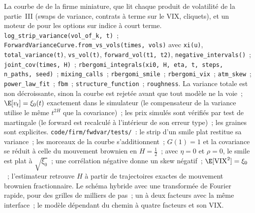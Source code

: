 \begin{build}
 La courbe de  de la firme miniature, que lit chaque produit de volatilité de la partie~III
(swaps de variance, contrats à terme sur le VIX, cliquets), et un moteur de  pour les options sur indice à court terme.
 \texttt{log\_strip\_variance(vol\_of\_k, t)}~; \texttt{ForwardVarianceCurve}\allowbreak\texttt{.from\_vs\_vols(times, vols)} avec \texttt{xi(u)}, \texttt{total\_variance(t)}, \texttt{vs\_vol(t)}, \texttt{forward\_vol(t1, t2)},
\texttt{negative\_intervals()}~; \texttt{joint\_cov(times, H)}~; \texttt{rbergomi\_integrals(xi0, H, eta, t,
steps, n\_paths, seed)}~; \texttt{mixing\_calls}~; \texttt{rbergomi\_smile}~; \texttt{rbergomi\_vix}~; \texttt{atm\_skew}~;
\texttt{power\_law\_fit}~; \texttt{fbm}~; \texttt{structure\_function}~; \texttt{roughness}.
 La variance totale est non décroissante, sinon la courbe est rejetée avant que tout modèle ne la voie~;
$\E[v_t]=\xi_0(t)$ exactement dans le simulateur (le compensateur de la variance utilise le même $t^{2H}$ que la
covariance)~; les prix simulés sont vérifiés par test de martingale (le forward est recalculé à l'intérieur de son erreur type)~;
les graines sont explicites.
 \texttt{code/firm/fwdvar/tests/}~: le strip d'un smile plat restitue sa variance~; les morceaux de la courbe
s'additionnent~; $G(1)=1$ et la covariance se réduit à celle du mouvement brownien en $H=\frac12$~; avec $\eta=0$ et
$\rho=0$, le smile est plat à $\sqrt{\xi_0}$~; une corrélation négative donne un skew négatif~;
$\E[\mathrm{VIX}^2]=\xi_0$~; l'estimateur retrouve $H$ à partir de trajectoires exactes de mouvement brownien fractionnaire.
 Le schéma hybride avec une transformée de Fourier rapide, pour des grilles de milliers de pas~; un
 à deux facteurs avec la même interface~; le modèle dépendant du chemin à quatre facteurs et son VIX.
\end{build}


